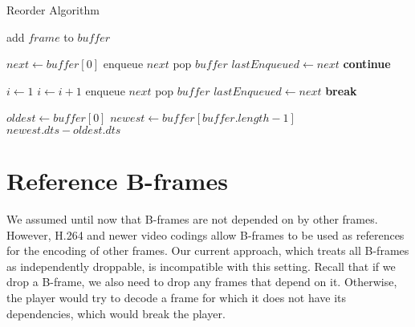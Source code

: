 \begin{algorithm}
\caption{Reorder Algorithm}\label{alg:reorder}
\begin{algorithmic}
        \State \Return {}
    \EndIf
    \item[]
    \State add $frame$ to $buffer$
    \item[]
        \State $next \gets buffer[0]$
            \State enqueue $next$
            \State pop $buffer$
            \State $lastEnqueued \gets next$
            \State \textbf{continue}
        \EndIf
        \item[]
        \State $i \gets 1$ 
            \State $i \gets i + 1$
        \EndWhile
         
            \State enqueue $next$
            \State pop $buffer$
            \State $lastEnqueued \gets next$
        \Else {}
            \State \textbf{break} 
        \EndIf
    \EndWhile
\EndFunction
\item[]
        \State {}
    \EndIf
    \item[]
    \State $oldest \gets buffer[0]$
    \State $newest \gets buffer[buffer.length - 1]$
    \State \Return $newest.dts - oldest.dts$
\EndFunction
\end{algorithmic}
\end{algorithm}

\section{Reference B-frames}
We assumed until now that B-frames are not depended on by other frames. However, H.264 and newer video codings allow B-frames to be used as references for the encoding of other frames. Our current approach, which treats all B-frames as independently droppable, is incompatible with this setting. Recall that if we drop a B-frame, we also need to drop any frames that depend on it. Otherwise, the player would try to decode a frame for which it does not have its dependencies, which would break the player.

